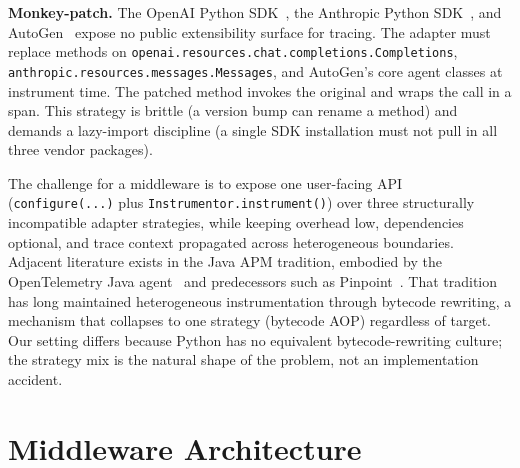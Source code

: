 \documentclass[sigconf,review,anonymous,9pt]{acmart}
\begin{document}
\textbf{Monkey-patch.} The OpenAI Python SDK~\cite{openai_sdk}, the
Anthropic Python SDK~\cite{anthropic_sdk}, and AutoGen~\cite{autogen}
expose no public extensibility surface for tracing. The adapter must
replace methods on
\texttt{openai.resources.chat.completions.Completions},
\texttt{anthropic.resources.messages.Messages}, and
AutoGen's core agent classes at instrument time. The patched method
invokes the original and wraps the call in a span. This strategy is
brittle (a version bump can rename a method) and demands a lazy-import
discipline (a single SDK installation must not pull in all three
vendor packages).

The challenge for a middleware is to expose one user-facing API
(\texttt{configure(...)} plus \texttt{Instrumentor.instrument()})
over three structurally incompatible adapter strategies, while
keeping overhead low, dependencies optional, and trace context
propagated across heterogeneous boundaries. Adjacent literature
exists in the Java APM tradition, embodied by the OpenTelemetry Java
agent~\cite{otel_java_agent} and predecessors such as
Pinpoint~\cite{pinpoint}. That tradition has long maintained
heterogeneous instrumentation through bytecode rewriting, a
mechanism that collapses to one strategy (bytecode AOP) regardless
of target. Our setting differs because Python has no equivalent
bytecode-rewriting culture; the strategy mix is the natural shape of
the problem, not an implementation accident.

\section{Middleware Architecture}
\label{sec:arch}
\end{document}
